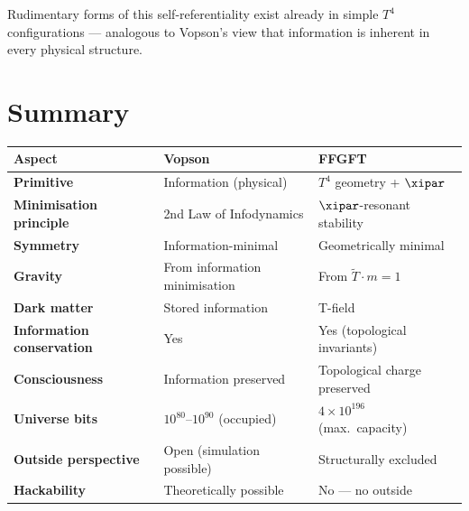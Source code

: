 Rudimentary forms of this self-referentiality exist already in simple
$T^4$ configurations --- analogous to Vopson's view that information is
inherent in every physical structure.

\section*{Summary}

\begin{longtable}{>{\bfseries}p{5cm} p{4.5cm} p{4.5cm}}
\toprule
Aspect & Vopson & FFGFT \\
\midrule
Primitive & Information (physical) & $T^4$ geometry + $\xipar$ \\
Minimisation principle & 2nd Law of Infodynamics & $\xipar$-resonant stability \\
Symmetry & Information-minimal & Geometrically minimal \\
Gravity & From information minimisation & From $\tilde{T} \cdot m = 1$ \\
Dark matter & Stored information & T-field \\
Information conservation & Yes & Yes (topological invariants) \\
Consciousness & Information preserved & Topological charge preserved \\
Universe bits & $10^{80}$--$10^{90}$ (occupied) & $4\times10^{196}$ (max.\ capacity) \\
Outside perspective & Open (simulation possible) & Structurally excluded \\
Hackability & Theoretically possible & No --- no outside \\
\bottomrule
\end{longtable}
